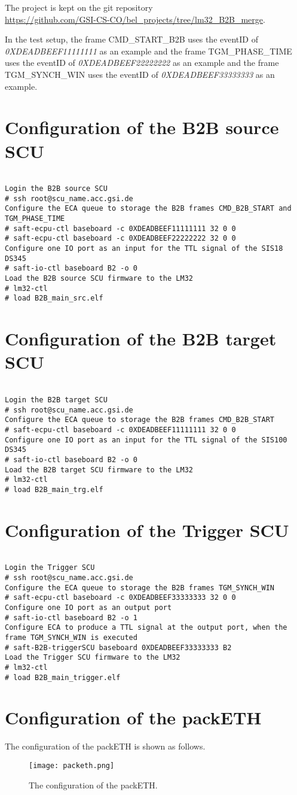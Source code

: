 \label{appendix_conf}
The project is kept on the git repository \\ \url{https://github.com/GSI-CS-CO/bel_projects/tree/lm32_B2B_merge}. 

In the test setup, the frame CMD\_START\_B2B uses the eventID of \textit{0XDEADBEEF11111111} as an example and the frame TGM\_PHASE\_TIME uses the eventID of \textit{0XDEADBEEF22222222} as an example and the frame TGM\_SYNCH\_WIN uses the eventID of \textit{0XDEADBEEF33333333} as an example.

\section{Configuration of the B2B source SCU}
\begin{lstlisting}[frame=single]  % Start your code-block

Login the B2B source SCU
# ssh root@scu_name.acc.gsi.de
Configure the ECA queue to storage the B2B frames CMD_B2B_START and TGM_PHASE_TIME
# saft-ecpu-ctl baseboard -c 0XDEADBEEF11111111 32 0 0
# saft-ecpu-ctl baseboard -c 0XDEADBEEF22222222 32 0 0
Configure one IO port as an input for the TTL signal of the SIS18 DS345
# saft-io-ctl baseboard B2 -o 0
Load the B2B source SCU firmware to the LM32
# lm32-ctl
# load B2B_main_src.elf
\end{lstlisting}
\section{Configuration of the B2B target SCU}
\begin{lstlisting}[frame=single]  % Start your code-block

Login the B2B target SCU
# ssh root@scu_name.acc.gsi.de
Configure the ECA queue to storage the B2B frames CMD_B2B_START
# saft-ecpu-ctl baseboard -c 0XDEADBEEF11111111 32 0 0
Configure one IO port as an input for the TTL signal of the SIS100 DS345
# saft-io-ctl baseboard B2 -o 0
Load the B2B target SCU firmware to the LM32
# lm32-ctl
# load B2B_main_trg.elf
\end{lstlisting}
\section{Configuration of the Trigger SCU}
\begin{lstlisting}[frame=single]  % Start your code-block

Login the Trigger SCU
# ssh root@scu_name.acc.gsi.de
Configure the ECA queue to storage the B2B frames TGM_SYNCH_WIN
# saft-ecpu-ctl baseboard -c 0XDEADBEEF33333333 32 0 0
Configure one IO port as an output port
# saft-io-ctl baseboard B2 -o 1
Configure ECA to produce a TTL signal at the output port, when the frame TGM_SYNCH_WIN is executed
# saft-B2B-triggerSCU baseboard 0XDEADBEEF33333333 B2
Load the Trigger SCU firmware to the LM32
# lm32-ctl
# load B2B_main_trigger.elf
\end{lstlisting}
\section{Configuration of the packETH}
The configuration of the packETH is shown as follows. 
\begin{figure}[!htb]
   \centering   
   \texttt{[image: packeth.png]}
   \caption{The configuration of the packETH.}
   \label{packeth}
\end{figure}